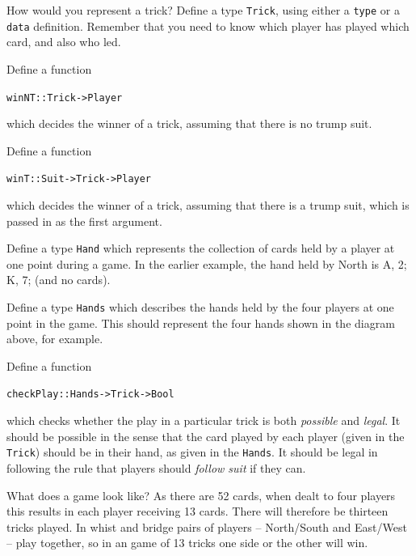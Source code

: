 \begin{exercises}

\item
How would you represent a trick? Define a type \texttt{Trick}, using either a \texttt{type} or a \texttt{data} definition. Remember that you need to know which player has played which card, and also who led.

\item
Define a function
\begin{alltt}
winNT :: Trick -> Player
\end{alltt}
which decides the winner of a trick, assuming that there is no trump suit.

\item
Define a function
\begin{alltt}
winT :: Suit -> Trick -> Player
\end{alltt}
which decides the winner of a trick, assuming that there is a trump suit, which is passed in as the first argument.

\item
Define a type \texttt{Hand} which represents the collection of cards held by a player at one point during a game. In the earlier example, the hand held by North is \spade A, 2; \heart K, 7;  (and no \club{} cards). 

\item Define a type \texttt{Hands} which describes the hands held by the four players at one point in the game. This should represent the four hands shown in the diagram above, for example.

\item
Define a function
\begin{alltt}
checkPlay :: Hands -> Trick -> Bool
\end{alltt}
which checks whether the play in a particular trick is both \emph{possible} and \emph{legal}. It should be possible in the sense that the card played by each player (given in the \texttt{Trick}) should be in their hand, as given in the \texttt{Hands}. It should be legal in following the rule that players should \emph{follow suit} if they can.
\end{exercises}

\noindent
What does a game look like? As there are 52 cards, when dealt to four players this results in each player receiving 13 cards. There will therefore be thirteen tricks played. In whist and bridge pairs of players -- North/South and East/West -- play together, so in an game of 13 tricks one side or the other will win.


